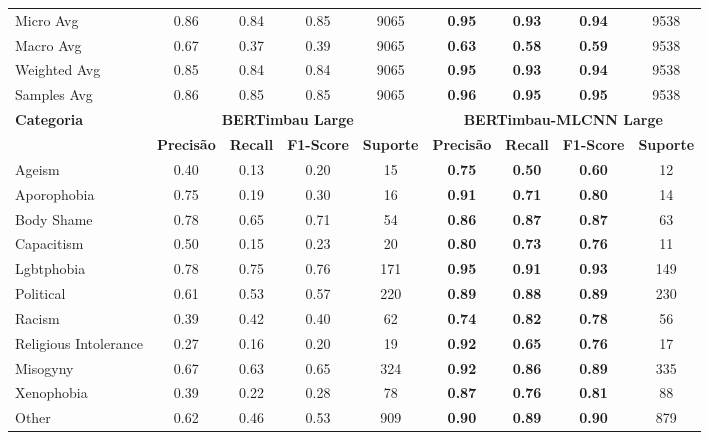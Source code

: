 \documentclass[sigconf,nonacm]{acmart}
\begin{document}
\begin{table}[H]
{\begin{tabular}{lcccccccc}
              Micro Avg & 0.86 & 0.84 & 0.85 & 9065 & \textbf{0.95} & \textbf{0.93} & \textbf{0.94} & 9538 \\
              Macro Avg & 0.67 & 0.37 & 0.39 & 9065 & \textbf{0.63} & \textbf{0.58} & \textbf{0.59} & 9538 \\
              Weighted Avg & 0.85 & 0.84 & 0.84 & 9065 & \textbf{0.95} & \textbf{0.93} & \textbf{0.94} & 9538 \\
              Samples Avg & 0.86 & 0.85 & 0.85 & 9065 & \textbf{0.96} & \textbf{0.95} & \textbf{0.95} & 9538 \\
            \midrule
      \textbf{Categoria} & \multicolumn{4}{c}{\textbf{BERTimbau Large}} & \multicolumn{4}{c}{\textbf{BERTimbau-MLCNN Large}} \\
        \cmidrule(lr){2-5} \cmidrule(lr){6-9}
          & \textbf{Precisão} & \textbf{Recall} & \textbf{F1-Score} & \textbf{Suporte} & \textbf{Precisão} & \textbf{Recall} & \textbf{F1-Score} & \textbf{Suporte} \\
            \midrule
              Ageism & 0.40 & 0.13 & 0.20 & 15 & \textbf{0.75} & \textbf{0.50} & \textbf{0.60} & 12 \\
              Aporophobia & 0.75 & 0.19 & 0.30 & 16 & \textbf{0.91} & \textbf{0.71} & \textbf{0.80} & 14 \\
              Body Shame & 0.78 & 0.65 & 0.71 & 54 & \textbf{0.86} & \textbf{0.87} & \textbf{0.87} & 63 \\
              Capacitism & 0.50 & 0.15 & 0.23 & 20 & \textbf{0.80} & \textbf{0.73} & \textbf{0.76} & 11 \\
              Lgbtphobia & 0.78 & 0.75 & 0.76 & 171 & \textbf{0.95} & \textbf{0.91} & \textbf{0.93} & 149 \\
              Political & 0.61 & 0.53 & 0.57 & 220 & \textbf{0.89} & \textbf{0.88} & \textbf{0.89} & 230 \\
              Racism & 0.39 & 0.42 & 0.40 & 62 & \textbf{0.74} & \textbf{0.82} & \textbf{0.78} & 56 \\
              Religious Intolerance & 0.27 & 0.16 & 0.20 & 19 & \textbf{0.92} & \textbf{0.65} & \textbf{0.76} & 17 \\
              Misogyny & 0.67 & 0.63 & 0.65 & 324 & \textbf{0.92} & \textbf{0.86} & \textbf{0.89} & 335 \\
              Xenophobia & 0.39 & 0.22 & 0.28 & 78 & \textbf{0.87} & \textbf{0.76} & \textbf{0.81} & 88 \\
              Other & 0.62 & 0.46 & 0.53 & 909 & \textbf{0.90} & \textbf{0.89} & \textbf{0.90} & 879 \\

\end{tabular}}
\end{table}
\end{document}
